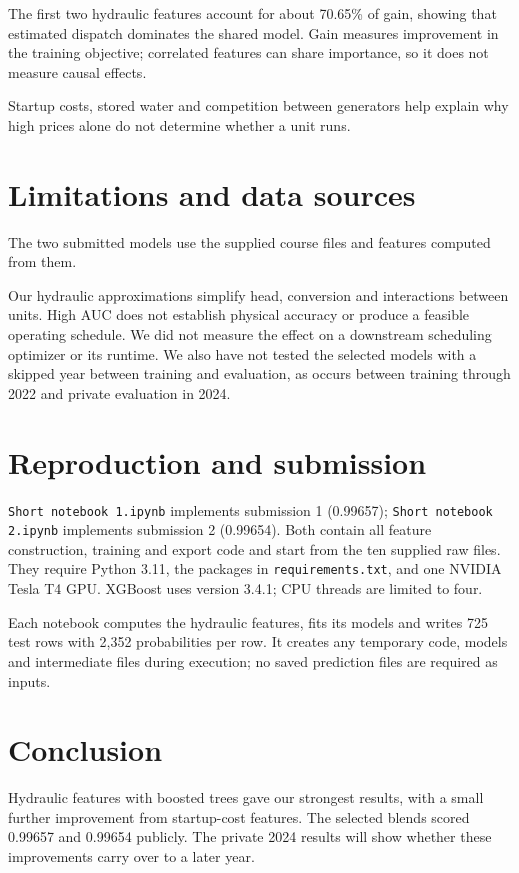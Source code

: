 \documentclass[a4paper,11pt]{article}
\begin{document}
The first two hydraulic features account for about 70.65\% of gain, showing that estimated dispatch dominates the shared model. Gain measures improvement in the training objective; correlated features can share importance, so it does not measure causal effects.

Startup costs, stored water and competition between generators help explain why high prices alone do not determine whether a unit runs.

\clearpage
\section{Limitations and data sources}
The two submitted models use the supplied course files and features computed from them.

Our hydraulic approximations simplify head, conversion and interactions between units. High AUC does not establish physical accuracy or produce a feasible operating schedule. We did not measure the effect on a downstream scheduling optimizer or its runtime. We also have not tested the selected models with a skipped year between training and evaluation, as occurs between training through 2022 and private evaluation in 2024.

\section{Reproduction and submission}
\texttt{Short notebook 1.ipynb} implements submission 1 (0.99657); \texttt{Short notebook 2.ipynb} implements submission 2 (0.99654). Both contain all feature construction, training and export code and start from the ten supplied raw files. They require Python 3.11, the packages in \texttt{requirements.txt}, and one NVIDIA Tesla T4 GPU. XGBoost uses version 3.4.1; CPU threads are limited to four.

Each notebook computes the hydraulic features, fits its models and writes 725 test rows with 2,352 probabilities per row. It creates any temporary code, models and intermediate files during execution; no saved prediction files are required as inputs.

\section{Conclusion}
Hydraulic features with boosted trees gave our strongest results, with a small further improvement from startup-cost features. The selected blends scored 0.99657 and 0.99654 publicly. The private 2024 results will show whether these improvements carry over to a later year.
\end{document}
